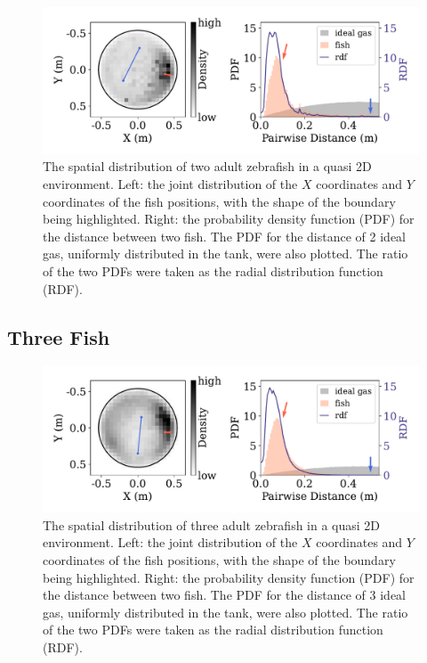 \documentclass[11pt,twoside]{report}
\begin{document}
\begin{figure}
  \includegraphics[width=\linewidth]{dist-2-fish}
  \caption[The 2D spatial distribution of two fish]{The spatial distribution of two adult zebrafish in a quasi 2D environment. Left: the joint distribution of the $X$ coordinates and $Y$ coordinates of the fish positions, with the shape of the boundary being highlighted. Right: the probability density function (PDF) for the distance between two fish. The PDF for the distance of 2 ideal gas, uniformly distributed in the tank, were also plotted. The ratio of the two PDFs were taken as the radial distribution function (RDF).}
  \label{fig:density_2d_fish_2}
\end{figure}


\subsection{Three Fish}
\label{section:fish_3_2d}


\begin{figure}
  \includegraphics[width=\linewidth]{dist-3-fish}
  \caption[The 2D spatial distribution of three fish]{The spatial distribution of three adult zebrafish in a quasi 2D environment. Left: the joint distribution of the $X$ coordinates and $Y$ coordinates of the fish positions, with the shape of the boundary being highlighted. Right: the probability density function (PDF) for the distance between two fish. The PDF for the distance of 3 ideal gas, uniformly distributed in the tank, were also plotted. The ratio of the two PDFs were taken as the radial distribution function (RDF).}
  \label{fig:density_2d_fish_3}
\end{figure}
\end{document}
